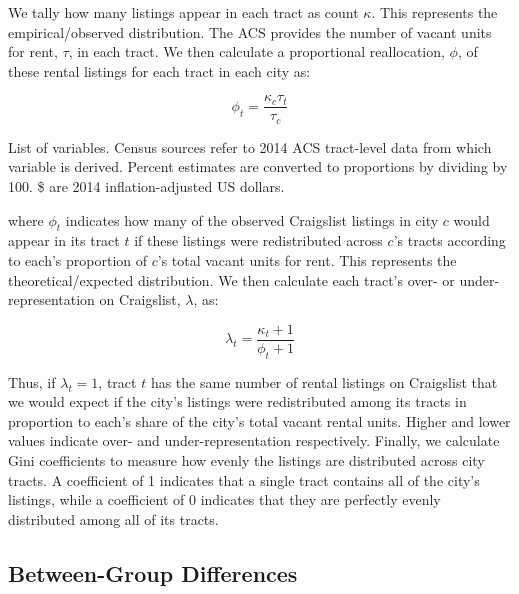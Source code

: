 \documentclass[11pt,letterpaper]{article}
\begin{document}
We tally how many listings appear in each tract as count $\kappa$. This represents the empirical/observed distribution. The ACS provides the number of vacant units for rent, $\tau$, in each tract. We then calculate a proportional reallocation, $\phi$, of these rental listings for each tract in each city as:

\begin{equation}
	\label{eq:allocation}
	\phi_t = \frac{\kappa_c \tau_t}{\tau_c}
\end{equation}

\begin{table}[tbp]
	\centering
	\small
	\caption{List of variables. Census sources refer to 2014 ACS tract-level data from which variable is derived. Percent estimates are converted to proportions by dividing by 100. \$ are 2014 inflation-adjusted US dollars.}
	\label{tab:variables_list}
	
\end{table}

where $\phi_t$ indicates how many of the observed Craigslist listings in city $c$ would appear in its tract $t$ if these listings were redistributed across $c$'s tracts according to each's proportion of $c$'s total vacant units for rent. This represents the theoretical/expected distribution. We then calculate each tract's over- or under-representation on Craigslist, $\lambda$, as:

\begin{equation}
	\label{eq:representation}
	\lambda_t = \frac{\kappa_t + 1}{\phi_t + 1}
\end{equation}

Thus, if $\lambda_t=1$, tract $t$ has the same number of rental listings on Craigslist that we would expect if the city's listings were redistributed among its tracts in proportion to each's share of the city's total vacant rental units. Higher and lower values indicate over- and under-representation respectively. Finally, we calculate Gini coefficients to measure how evenly the listings are distributed across city tracts. A coefficient of 1 indicates that a single tract contains all of the city's listings, while a coefficient of 0 indicates that they are perfectly evenly distributed among all of its tracts.


\subsection{Between-Group Differences}
\end{document}
